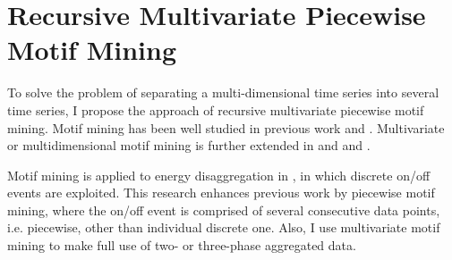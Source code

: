 \section{Recursive Multivariate Piecewise Motif Mining}
To solve the problem of separating a multi-dimensional time series into several time series, 
I propose the approach of recursive multivariate piecewise motif mining. 
Motif mining has been well studied in previous work \cite{motif1} and \cite{motif2}. 
Multivariate or multidimensional motif mining is further extended in \cite{minnen2007improving} and \cite{tanaka2005discovery} and \cite{motifgoal}. 

Motif mining is applied to energy disaggregation in \cite{shao2013temporal}, 
in which discrete on/off events are exploited. 
This research enhances previous work by piecewise motif mining, 
where the on/off event is comprised of several consecutive data points, 
i.e. piecewise, other than individual discrete one.
Also, I use multivariate motif mining to make full use of two- or three-phase aggregated data. 

